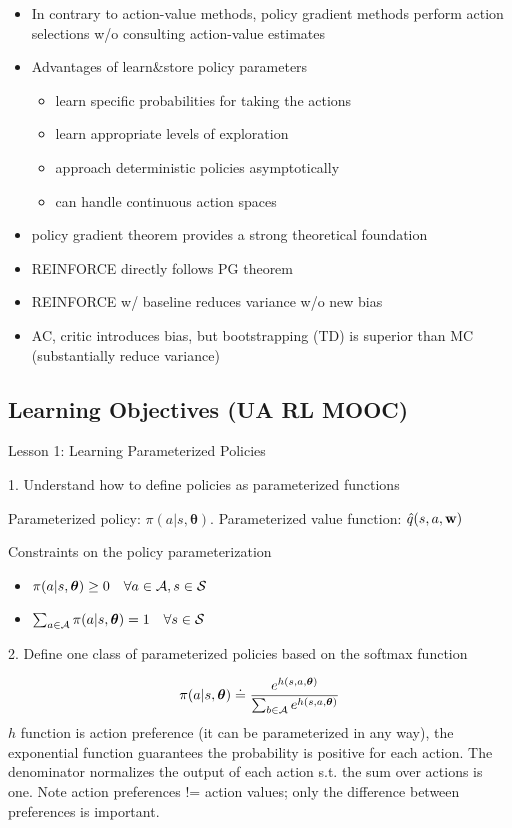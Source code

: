 \documentclass[sutton_barto_notes.tex]{subfiles}
\begin{document}
\begin{itemize}
\item In contrary to action-value methods, policy gradient methods perform action selections w/o consulting action-value estimates
\item Advantages of learn\&store policy parameters
\begin{itemize}
\item learn specific probabilities for taking the actions
\item learn appropriate levels of exploration
\item approach deterministic policies asymptotically
\item can handle continuous action spaces
\end{itemize}
\item policy gradient theorem provides a strong theoretical foundation
\item REINFORCE directly follows PG theorem
\item REINFORCE w/ baseline reduces variance w/o new bias
\item AC, critic introduces bias, but bootstrapping (TD) is superior than MC (substantially reduce variance)
\end{itemize}

\subsection{Learning Objectives (UA RL MOOC)}

Lesson 1: Learning Parameterized Policies 

1. Understand how to define policies as parameterized functions 

Parameterized policy: $\pi(a|s,\bm{\theta})$. Parameterized value function: $\hat{q}(s,a,{\operatorname*{\mathbf{w}}})$

Constraints on the policy parameterization
\begin{itemize}
\item $\pi(a|s,\bm{\theta}) \geq 0 \quad \forall a \in \operatorname*{\mathcal{A}}, s \in \operatorname*{\mathcal{S}}$
\item $\sum_{a\in\operatorname*{\mathcal{A}}} \pi(a|s,\bm{\theta}) = 1 \quad \forall s \in \operatorname*{\mathcal{S}}$
\end{itemize}

2. Define one class of parameterized policies based on the softmax function 

$$\pi(a|s,\bm{\theta})\doteq \frac{e^{h(s,a,\bm{\theta})}}{\sum_{b\in\operatorname*{\mathcal{A}}}e^{h(s,a,\bm{\theta})}}$$
$h$ function is action preference (it can be parameterized in any way), the exponential function guarantees the probability is positive for each action. The denominator normalizes the output of each action s.t. the sum over actions is one.
Note action preferences != action values; only the difference between preferences is important.
\end{document}
